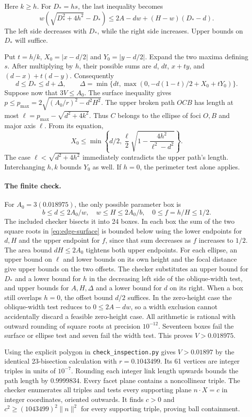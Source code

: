 Here $k\ge h$. For $D_*=hs$, the last inequality becomes
\[
 w(\sqrt{D_*^2+4h^2}-D_*)\le 2A-dw+(H-w)(D_*-d).
\]
The left side decreases with $D_*$, while the right side increases. Upper bounds on $D_*$ will suffice.

Put $t=h/k$, $X_0=|x-d/2|$ and $Y_0=|y-d/2|$. Expand the two maxima defining $s$. After multiplying by $h$, their possible sums are $d$, $dt$, $x+ty$, and $(d-x)+t(d-y)$. Consequently
\[
 d\le D_*\le d+\Delta,\qquad
 \Delta=\min\{dt,\max(0,-d(1-t)/2+X_0+tY_0)\}.
\]
Suppose now that $3V\le A_0$. The surface inequality gives $p\le p_{\max}=2\sqrt{(A_0/r)^2-d^2H^2}$. The upper broken path $OCB$ has length at most $\ell=p_{\max}-\sqrt{d^2+4k^2}$. Thus $C$ belongs to the ellipse of foci $O,B$ and major axis $\ell$. From its equation,
\[
 X_0\le\min\left\{d/2,\frac{\ell}{2}\sqrt{1-\frac{4h^2}{\ell^2-d^2}}\right\}.
\]
The case $\ell<\sqrt{d^2+4h^2}$ immediately contradicts the upper path's length. Interchanging $h,k$ bounds $Y_0$ as well. If $h=0$, the perimeter test alone applies.

\paragraph{The finite check.}
For $A_0=3(0.018975)$, the only possible parameter box is
\[
 b\le d\le2A_0/w,\quad w\le H\le2A_0/b,\quad 0\le f=h/H\le1/2.
\]
The included checker bisects it into 24 boxes. In each box the sum of the two square roots in \eqref{eq:edge-surface} is bounded below using the lower endpoints for $d,H$ and the upper endpoint for $f$, since that sum decreases as $f$ increases to $1/2$. The area bound $dH\le2A_0$ tightens both upper endpoints. For each ellipse, an upper bound on $\ell$ and lower bounds on its own height and the focal distance give upper bounds on the two offsets. The checker substitutes an upper bound for $D_*$ and a lower bound for $h$ in the decreasing left side of the oblique-width test, and upper bounds for $A,H,\Delta$ and a lower bound for $d$ on its right. When a box still overlaps $h=0$, the offset bound $d/2$ suffices. In the zero-height case the oblique-width test reduces to $0\le2A-dw$, so a width exclusion cannot accidentally discard a feasible zero-height case.
All arithmetic is rational with outward rounding of square roots at precision $10^{-12}$. Seventeen boxes fail the surface or ellipse test and seven fail the width test. This proves $V>0.018975$.

Using the explicit polygon in \texttt{check\_inspection.py} gives $V>0.01897$ by the identical 23-bisection calculation with $r=0.1043499$. Its 61 vertices are integer triples in units of $10^{-7}$. Rounding each integer link length upwards bounds the path length by $0.9999834$. Every facet plane contains a noncollinear triple. The checker enumerates all triples and tests every supporting plane $n\cdot X=c$ in integer coordinates, oriented outwards. It finds $c>0$ and $c^2\ge(1043499)^2\|n\|^2$ for every supporting triple, proving ball containment.
